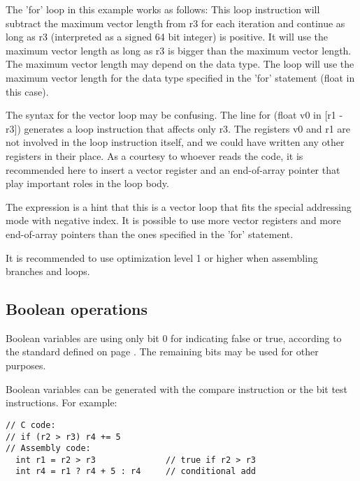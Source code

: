 \documentclass[forwardcom.tex]{subfiles}
\begin{document}
The 'for' loop in this example works as follows: 
This loop instruction will subtract the maximum vector length from {\ttfamily r3} for each iteration and continue as long as {\ttfamily r3} (interpreted as a signed 64 bit integer) is positive. It will use the maximum vector length as long as {\ttfamily r3} is bigger than the maximum vector length. 
The maximum vector length may depend on the data type. The loop will use the maximum vector length for the data type specified in the 'for' statement (float in this case).
\vv

The syntax for the vector loop may be confusing. 
The line \hspace{1mm} {\ttfamily for (float v0 in [r1 - r3])} \hspace{1mm} generates a loop instruction that affects only {\ttfamily r3}. 
The registers {\ttfamily v0} and {\ttfamily r1} are not involved in the loop instruction itself, and we could have written any other registers in their place. As a courtesy to whoever reads the code, it is recommended here to insert a vector register and an end-of-array pointer that play important roles in the loop body. 
\vv

The expression \hspace{1mm} {\ttfamily [r1 - r3]} \hspace{1mm} is a hint that this is a vector loop that fits the special addressing mode with negative index. 
It is possible to use more vector registers and more end-of-array pointers than the ones specified in the 'for' statement.
\vv

It is recommended to use optimization level 1 or higher when assembling branches and loops.
\vv


\subsection{Boolean operations} \label{BooleanOperations}
Boolean variables are using only bit 0 for indicating false or true, according to the standard defined on page \pageref{booleanRepresentation}. The remaining bits may be used for other purposes.
\vv

Boolean variables can be generated with the compare instruction or the bit test instructions. For example:

\begin{lstlisting}[frame=single]
// C code: 
// if (r2 > r3) r4 += 5
// Assembly code:
  int r1 = r2 > r3              // true if r2 > r3
  int r4 = r1 ? r4 + 5 : r4     // conditional add
\end{lstlisting}
\vv
\end{document}
